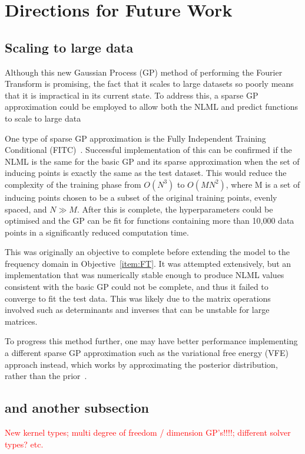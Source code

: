 \documentclass[12pt]{article}
\begin{document}
    \section{Directions for Future Work}

    \subsection{Scaling to large data}
    Although this new Gaussian Process (GP) method of performing the Fourier Transform is promising, the fact that it scales to large datasets so poorly means that it is impractical in its current state.
    To address this, a sparse GP approximation could be employed to allow both the NLML and predict functions to scale to large data

    One type of sparse GP approximation is the Fully Independent Training Conditional (FITC)~\cite{q-candela}.
    Successful implementation of this can be confirmed if the NLML is the same for the basic GP and its sparse approximation when the set of inducing points is exactly the same as the test dataset.
    This would reduce the complexity of the training phase from $O(N^3)$ to $O(MN^2)$, where M is a set of inducing points chosen to be a subset of the original training points, evenly spaced, and $N \gg M$. 
    After this is complete, the hyperparameters could be optimised and the GP can be fit for functions containing more than 10,000 data points in a significantly reduced computation time.

     This was originally an objective to complete before extending the model to the frequency domain in Objective~\ref{item:FT}.
    It was attempted extensively, but an implementation that was numerically stable enough to produce NLML values consistent with the basic GP could not be complete, and thus it failed to converge to fit the test data.
    This was likely due to the matrix operations involved such as determinants and inverses that can be unstable for large matrices.

    To progress this method further, one may have better performance implementing a different sparse GP approximation such as the variational free energy (VFE) approach instead, which works by approximating the posterior distribution, rather than the prior~\cite{murphy2023probabilistic}.

    \subsection{and another subsection}
    \textcolor{red}{ New kernel types; multi degree of freedom / dimension GP's!!!!; different solver types? etc.}
\end{document}
